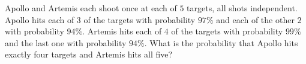 Apollo and Artemis each shoot once at each of $5$ targets, all shots independent. Apollo hits each of $3$ of the targets with probability $97\%$ and each of the other $2$ with probability $94\%$. Artemis hits each of $4$ of the targets with probability $99\%$ and the last one with probability $94\%$. What is the probability that Apollo hits exactly four targets and Artemis hits all five?
